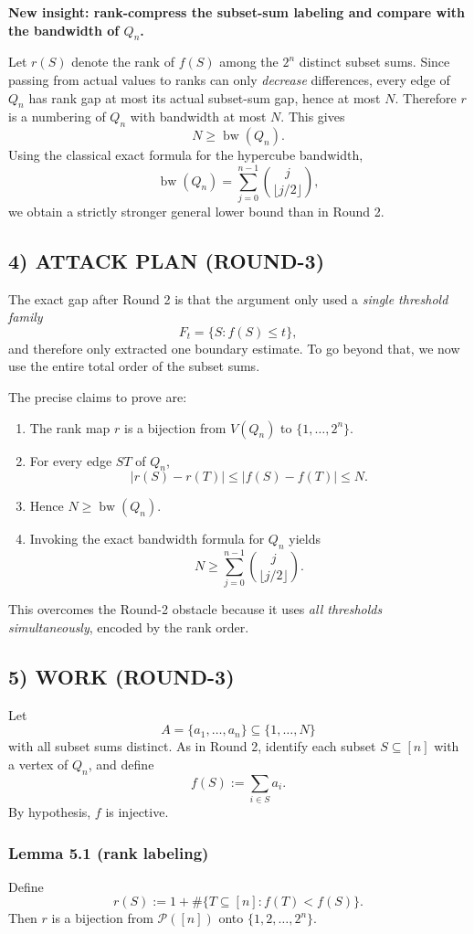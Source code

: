 \textbf{New insight: rank-compress the subset-sum labeling and compare with the bandwidth of $Q_n$.}

Let $r(S)$ denote the rank of $f(S)$ among the $2^n$ distinct subset sums. Since passing from actual values to ranks can only \emph{decrease} differences, every edge of $Q_n$ has rank gap at most its actual subset-sum gap, hence at most $N$. Therefore $r$ is a numbering of $Q_n$ with bandwidth at most $N$. This gives
\[
N\ge \operatorname{bw}(Q_n).
\]
Using the classical exact formula for the hypercube bandwidth,
\[
\operatorname{bw}(Q_n)=\sum_{j=0}^{n-1}\binom{j}{\lfloor j/2\rfloor},
\]
we obtain a strictly stronger general lower bound than in Round 2.

\subsection{4) ATTACK PLAN (ROUND-3)}

The exact gap after Round 2 is that the argument only used a \emph{single threshold family}
\[
F_t=\{S: f(S)\le t\},
\]
and therefore only extracted one boundary estimate. To go beyond that, we now use the entire total order of the subset sums.

The precise claims to prove are:
\begin{enumerate}
\item The rank map $r$ is a bijection from $V(Q_n)$ to $\{1,\dots,2^n\}$.
\item For every edge $ST$ of $Q_n$,
\[
|r(S)-r(T)|\le |f(S)-f(T)|\le N.
\]
\item Hence $N\ge \operatorname{bw}(Q_n)$.
\item Invoking the exact bandwidth formula for $Q_n$ yields
\[
N\ge \sum_{j=0}^{n-1}\binom{j}{\lfloor j/2\rfloor}.
\]
\end{enumerate}

This overcomes the Round-2 obstacle because it uses \emph{all thresholds simultaneously}, encoded by the rank order.

\subsection{5) WORK (ROUND-3)}

Let
\[
A=\{a_1,\dots,a_n\}\subseteq \{1,\dots,N\}
\]
with all subset sums distinct. As in Round 2, identify each subset $S\subseteq [n]$ with a vertex of $Q_n$, and define
\[
f(S):=\sum_{i\in S} a_i.
\]
By hypothesis, $f$ is injective.

\subsubsection*{Lemma 5.1 (rank labeling)}
Define
\[
r(S):=1+\#\{T\subseteq [n]: f(T)<f(S)\}.
\]
Then $r$ is a bijection from $\mathcal P([n])$ onto $\{1,2,\dots,2^n\}$.

